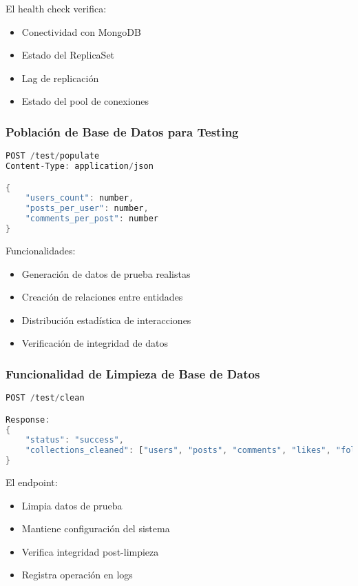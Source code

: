 \documentclass[12pt,letterpaper]{article}
\begin{document}
El health check verifica:
\begin{itemize}
    \item Conectividad con MongoDB
    \item Estado del ReplicaSet
    \item Lag de replicación
    \item Estado del pool de conexiones
\end{itemize}

\subsubsection{Población de Base de Datos para Testing}
\begin{lstlisting}[language=rust]
POST /test/populate
Content-Type: application/json

{
    "users_count": number,
    "posts_per_user": number,
    "comments_per_post": number
}
\end{lstlisting}

Funcionalidades:
\begin{itemize}
    \item Generación de datos de prueba realistas
    \item Creación de relaciones entre entidades
    \item Distribución estadística de interacciones
    \item Verificación de integridad de datos
\end{itemize}

\subsubsection{Funcionalidad de Limpieza de Base de Datos}
\begin{lstlisting}[language=rust]
POST /test/clean

Response:
{
    "status": "success",
    "collections_cleaned": ["users", "posts", "comments", "likes", "follows"]
}
\end{lstlisting}

El endpoint:
\begin{itemize}
    \item Limpia datos de prueba
    \item Mantiene configuración del sistema
    \item Verifica integridad post-limpieza
    \item Registra operación en logs
\end{itemize}
\end{document}
